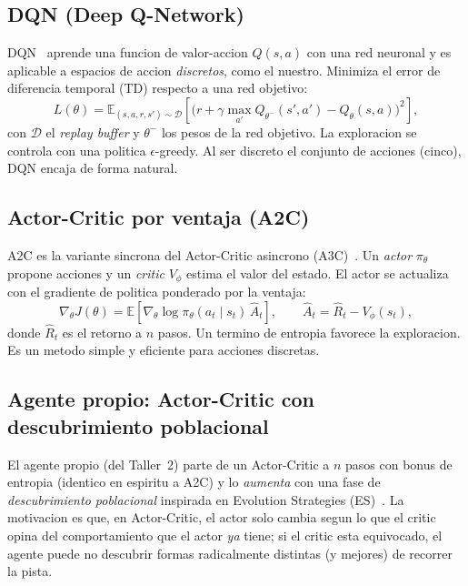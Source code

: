 \documentclass[conference]{IEEEtran}
\begin{document}
\subsection{DQN (Deep Q-Network)}
DQN~\cite{dqn} aprende una funcion de valor-accion $Q(s,a)$ con una red neuronal
y es aplicable a espacios de accion \emph{discretos}, como el nuestro. Minimiza
el error de diferencia temporal (TD) respecto a una red objetivo:
\begin{equation}
L(\theta) = \mathbb{E}_{(s,a,r,s')\sim \mathcal{D}}\!\left[
\big(r + \gamma \max_{a'} Q_{\theta^-}(s',a') - Q_\theta(s,a)\big)^2\right],
\end{equation}
con $\mathcal{D}$ el \emph{replay buffer} y $\theta^-$ los pesos de la red
objetivo. La exploracion se controla con una politica $\epsilon$-greedy. Al ser
discreto el conjunto de acciones (cinco), DQN encaja de forma natural.

\subsection{Actor-Critic por ventaja (A2C)}
A2C es la variante sincrona del Actor-Critic asincrono (A3C)~\cite{a3c}. Un
\emph{actor} $\pi_\theta$ propone acciones y un \emph{critic} $V_\phi$ estima el
valor del estado. El actor se actualiza con el gradiente de politica ponderado
por la ventaja:
\begin{equation}
\nabla_\theta J(\theta) =
\mathbb{E}\!\left[\nabla_\theta \log \pi_\theta(a_t\mid s_t)\,\hat{A}_t\right],
\qquad \hat{A}_t = \hat{R}_t - V_\phi(s_t),
\end{equation}
donde $\hat{R}_t$ es el retorno a $n$ pasos. Un termino de entropia favorece la
exploracion. Es un metodo simple y eficiente para acciones discretas.

\subsection{Agente propio: Actor-Critic con descubrimiento poblacional}
\label{sec:propio}
El agente propio (del Taller~2) parte de un Actor-Critic a $n$ pasos con bonus
de entropia (identico en espiritu a A2C) y lo \emph{aumenta} con una fase de
\emph{descubrimiento poblacional} inspirada en Evolution Strategies
(ES)~\cite{es}. La motivacion es que, en Actor-Critic, el actor solo cambia
segun lo que el critic opina del comportamiento que el actor \emph{ya} tiene;
si el critic esta equivocado, el agente puede no descubrir formas radicalmente
distintas (y mejores) de recorrer la pista.
\end{document}
